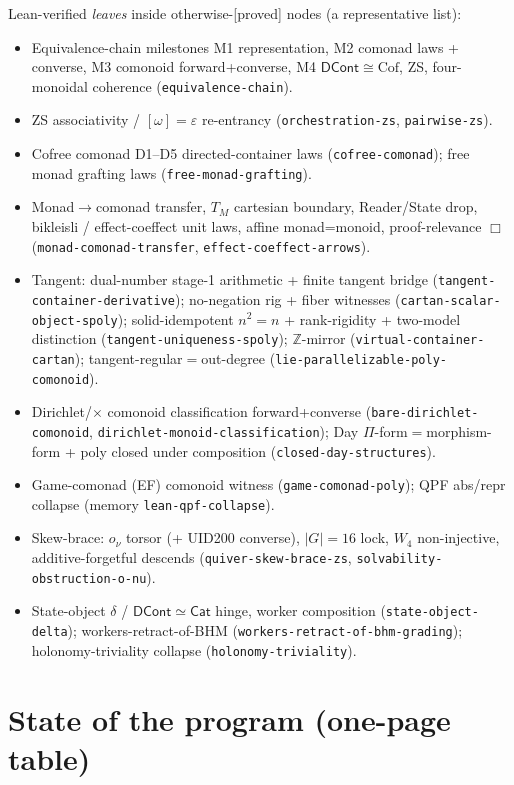 \documentclass[11pt]{article}
\newcommand{\DCont}{\mathsf{DCont}}
\newcommand{\Cat}{\mathsf{Cat}}
\newcommand{\reg}[1]{\texttt{#1}}
\newcommand{\grade}[1]{\textsf{[#1]}}
\begin{document}
Lean-verified \emph{leaves} inside otherwise-\grade{proved} nodes (a representative list):
\begin{itemize}[leftmargin=1.2em]
\item Equivalence-chain milestones M1 representation, M2 comonad laws + converse,
M3 comonoid forward+converse, M4 $\DCont\cong\mathrm{Cof}$, ZS, four-monoidal coherence
(\reg{equivalence-chain}).
\item ZS associativity / $[\omega]=\varepsilon$ re-entrancy (\reg{orchestration-zs},
\reg{pairwise-zs}).
\item Cofree comonad D1--D5 directed-container laws (\reg{cofree-comonad}); free monad
grafting laws (\reg{free-monad-grafting}).
\item Monad$\to$comonad transfer, $T_M$ cartesian boundary, Reader/State drop,
bikleisli / effect-coeffect unit laws, affine monad=monoid, proof-relevance $\Box$
(\reg{monad-comonad-transfer}, \reg{effect-coeffect-arrows}).
\item Tangent: dual-number stage-1 arithmetic + finite tangent bridge
(\reg{tangent-container-derivative}); no-negation rig + fiber witnesses
(\reg{cartan-scalar-object-spoly}); solid-idempotent $n^2=n$ + rank-rigidity + two-model
distinction (\reg{tangent-uniqueness-spoly}); $\mathbb{Z}$-mirror
(\reg{virtual-container-cartan}); tangent-regular$=$out-degree
(\reg{lie-parallelizable-poly-comonoid}).
\item Dirichlet/$\times$ comonoid classification forward+converse
(\reg{bare-dirichlet-comonoid}, \reg{dirichlet-monoid-classification}); Day
$\Pi$-form$=$morphism-form + poly closed under composition (\reg{closed-day-structures}).
\item Game-comonad (EF) comonoid witness (\reg{game-comonad-poly}); QPF abs/repr collapse
(memory \texttt{lean-qpf-collapse}).
\item Skew-brace: $o_\nu$ torsor (+ UID200 converse), $|G|=16$ lock, $W_4$ non-injective,
additive-forgetful descends (\reg{quiver-skew-brace-zs}, \reg{solvability-obstruction-o-nu}).
\item State-object $\delta$ / $\DCont\simeq\Cat$ hinge, worker composition
(\reg{state-object-delta}); workers-retract-of-BHM (\reg{workers-retract-of-bhm-grading});
holonomy-triviality collapse (\reg{holonomy-triviality}).
\end{itemize}

\section{State of the program (one-page table)}\label{sec:table}
\end{document}
